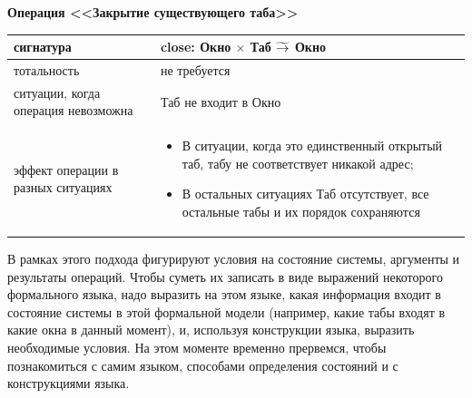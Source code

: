 \documentclass[14pt, twoside]{extreport}
\begin{document}
{\textbf{Операция <<Закрытие существующего таба>>}

\begin{tabular}{|p{}|p{}|}
  \hline
  сигнатура & close: Окно $\times$ Таб $\widetilde{\rightarrow}$ Окно \\ \hline
  тотальность & не требуется \\ \hline
  ситуации, когда операция невозможна & Таб не входит в Окно \\ \hline
  эффект операции в разных ситуациях & \begin{itemize}\item В ситуации, когда это единственный открытый таб, табу не соответствует никакой адрес;\item В остальных ситуациях Таб отсутствует, все остальные табы и их порядок сохраняются \end{itemize} \\ \hline
\end{tabular}
}

В рамках этого подхода фигурируют условия на состояние системы, аргументы и результаты операций. Чтобы суметь их записать в виде выражений некоторого формального языка, надо выразить на этом языке, какая информация входит в состояние системы в этой формальной модели (например, какие табы входят в какие окна в данный момент), и, используя конструкции языка, выразить необходимые условия. На этом моменте временно прервемся, чтобы познакомиться с самим языком, способами определения состояний и с конструкциями языка.
\end{document}
